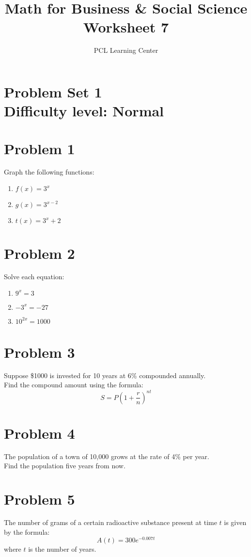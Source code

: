 \documentclass[12pt]{article}
\title{Math for Business \& Social Science\\ Worksheet 7}
\author{PCL Learning Center}
\date{}
\begin{document}
\maketitle

\section*{Problem Set 1\\Difficulty level: Normal}
\section*{Problem 1}
Graph the following functions:
\begin{enumerate}[label=(\alph*)]
    \item \( f(x) = 3^x \)
    \item \( g(x) = 3^{x - 2} \)
    \item \( t(x) = 3^x + 2 \)
\end{enumerate}

\section*{Problem 2}
Solve each equation:
\begin{enumerate}[label=(\alph*)]
    \item \( 9^x = 3 \)
    \item \( -3^x = -27 \)
    \item \( 10^{2x} = 1000 \)
\end{enumerate}

\section*{Problem 3}
Suppose \$1000 is invested for 10 years at 6\% compounded annually.\\
Find the compound amount using the formula:
\[
S = P\left(1 + \frac{r}{n} \right)^{nt}
\]

\section*{Problem 4}
The population of a town of 10,000 grows at the rate of 4\% per year.\\
Find the population five years from now.

\section*{Problem 5}
The number of grams of a certain radioactive substance present at time \( t \) is given by the formula:
\[
A(t) = 300e^{-0.007t}
\]
where \( t \) is the number of years.
\end{document}
